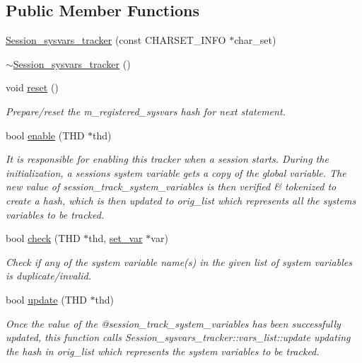 \subsection*{Public Member Functions}
\begin{DoxyCompactItemize}
\item 
\mbox{\hyperlink{classSession__sysvars__tracker_a17daba98568ee2911733480813d9f541}{Session\+\_\+sysvars\+\_\+tracker}} (const C\+H\+A\+R\+S\+E\+T\+\_\+\+I\+N\+FO $\ast$char\+\_\+set)
\item 
\mbox{\hyperlink{classSession__sysvars__tracker_a0f236f107c187d9b04ade54c8d637d10}{$\sim$\+Session\+\_\+sysvars\+\_\+tracker}} ()
\item 
void \mbox{\hyperlink{classSession__sysvars__tracker_a1b134fe57695e59ddef1d20ab2044036}{reset}} ()
\begin{DoxyCompactList}\small\item\em Prepare/reset the m\+\_\+registered\+\_\+sysvars hash for next statement. \end{DoxyCompactList}\item 
bool \mbox{\hyperlink{classSession__sysvars__tracker_abe0b7f50ef4c4e269a077f7784d2ce28}{enable}} (T\+HD $\ast$thd)
\begin{DoxyCompactList}\small\item\em It is responsible for enabling this tracker when a session starts. During the initialization, a session\textquotesingle{}s system variable gets a copy of the global variable. The new value of session\+\_\+track\+\_\+system\+\_\+variables is then verified \& tokenized to create a hash, which is then updated to orig\+\_\+list which represents all the systems variables to be tracked. \end{DoxyCompactList}\item 
bool \mbox{\hyperlink{classSession__sysvars__tracker_a8e2849a2c33fbbfcd81243d8d44fea6f}{check}} (T\+HD $\ast$thd, \mbox{\hyperlink{classset__var}{set\+\_\+var}} $\ast$var)
\begin{DoxyCompactList}\small\item\em Check if any of the system variable name(s) in the given list of system variables is duplicate/invalid. \end{DoxyCompactList}\item 
bool \mbox{\hyperlink{classSession__sysvars__tracker_a82607e850253dec7382bc49425179074}{update}} (T\+HD $\ast$thd)
\begin{DoxyCompactList}\small\item\em Once the value of the @session\+\_\+track\+\_\+system\+\_\+variables has been successfully updated, this function calls Session\+\_\+sysvars\+\_\+tracker\+::vars\+\_\+list\+::update updating the hash in orig\+\_\+list which represents the system variables to be tracked. \end{DoxyCompactList}\item 

\end{DoxyCompactItemize}
